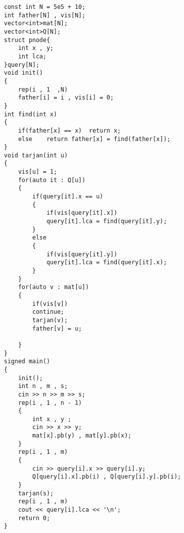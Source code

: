 \documentclass[E:/GsjzTle/main/main.tex]{subfiles}
\begin{document}
\begin{lstlisting}
const int N = 5e5 + 10;
int father[N] , vis[N];
vector<int>mat[N];
vector<int>Q[N];
struct pnode{
	int x , y;
	int lca;
}query[N];
void init()
{
	rep(i , 1  ,N)
	father[i] = i , vis[i] = 0;
}
int find(int x)
{
	if(father[x] == x)	return x;
	else	return father[x] = find(father[x]);
}
void tarjan(int u)
{
	vis[u] = 1;
	for(auto it : Q[u])
	{
		if(query[it].x == u)
		{
			if(vis[query[it].x])
			query[it].lca = find(query[it].y);
		}
		else 
		{
			if(vis[query[it].y])
			query[it].lca = find(query[it].x);
		}
	}
	for(auto v : mat[u])
	{
		if(vis[v])
		continue;
		tarjan(v);
		father[v] = u;
		
	}
}
signed main()
{
	init();
	int n , m , s;
	cin >> n >> m >> s;
	rep(i , 1 , n - 1)
	{
		int x , y ;
		cin >> x >> y;
		mat[x].pb(y) , mat[y].pb(x);
	}
	rep(i , 1 , m)
	{
		cin >> query[i].x >> query[i].y;
		Q[query[i].x].pb(i) , Q[query[i].y].pb(i);
	} 
	tarjan(s);
	rep(i , 1 , m)
	cout << query[i].lca << '\n';
	return 0;
}
\end{lstlisting}
\end{document}
